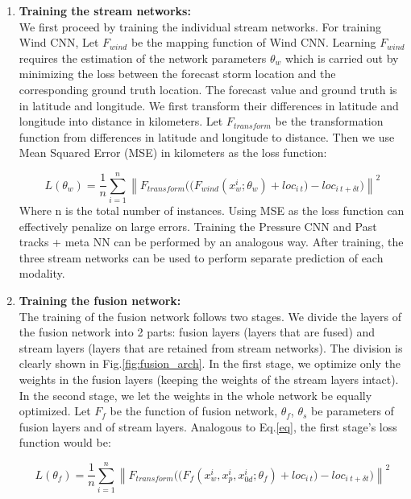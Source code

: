 \begin{enumerate}[leftmargin=2em]
	\item \textbf{Training the stream networks: }\\
	We first proceed by training the individual stream networks. For training Wind CNN, Let $F_{wind}$ be the mapping function of Wind CNN. Learning $F_{wind}$ requires the estimation of the network parameters $\theta_w$ which is carried out by minimizing the loss between the forecast storm location and the corresponding ground truth location.  The forecast value and ground truth is in latitude and longitude. We first transform their differences in latitude and longitude into distance in kilometers. Let $F_{transform}$ be the transformation function from differences in latitude and longitude to distance. Then we use Mean Squared Error (MSE) in kilometers as the loss function:
	
	\begin{equation}
	\label{eq}
	L(\theta_w) = \frac{1}{n}\sum_{i=1}^{n} \left \| {F_{transform}((F_{wind}(x_w^i; \theta_w)} + loc_{i\ t} ) - loc_{i\ t+\delta t} ) \right \| ^2
	\end{equation}
	Where n is the total number of instances. Using MSE as the loss function can effectively penalize on large errors. Training the Pressure CNN and Past tracks + meta NN can be performed by an analogous way. After training, the three stream networks can be used to perform separate prediction of each modality. 
	\item \textbf{Training the fusion network: }\\
	The training of the fusion network follows two stages. We divide the layers of the fusion network into 2 parts: fusion layers (layers that are fused) and stream layers (layers that are retained from stream networks). The division is clearly shown in Fig.\ref{fig:fusion_arch}. In the first stage, we optimize only the weights in the fusion layers (keeping the weights of the stream layers intact). In the second stage, we let the weights in the whole network be equally optimized. Let $F_{f}$ be the function of fusion network, $\theta_{f}$, $\theta_{s}$ be parameters of fusion layers and of stream layers. Analogous to Eq.\ref{eq}, the first stage's loss function would be:
	
	\begin{equation}
	\label{eq_fusion_1}
	L(\theta_{f}) = \frac{1}{n}\sum_{i=1}^{n} \left \| {F_{transform}((F_{f}(x_w^i, x_p^i, x_{0d}^i; \theta_{f})} + loc_{i\ t} ) - loc_{i\ t+\delta t} ) \right \| ^2
	\end{equation}
	

\end{enumerate}

